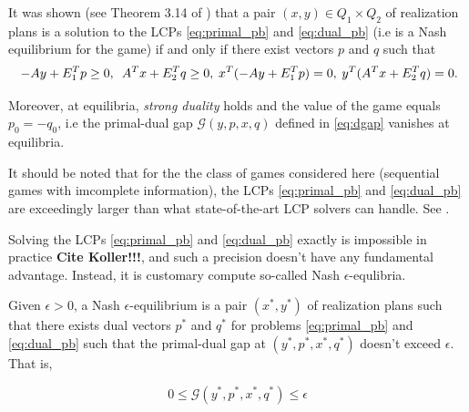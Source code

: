 \documentclass[envcountsame]{llncs} %
\begin{document}
It was shown (see Theorem 3.14 of \cite{vonequilibrium}) that a pair
$(x, y) \in Q_1 \times Q_2$ of realization plans is a solution to the
LCPs \eqref{eq:primal_pb} and \eqref{eq:dual_pb} (i.e is a Nash
equilibrium for the game)  if and only if there exist vectors $p$ and
$q$ such that
\begin{equation}
\hspace{.25em} -Ay + E_1^Tp \ge 0, \hspace{.5em}A^Tx + E_2^Tq \ge
0, \hspace{.25em} x^T(-Ay + E_1^Tp) = 0, \hspace{.25em} y^T(A^Tx +
E_2^Tq) = 0.
\label{eq:feasibility}
\end{equation}

Moreover, at equilibria, \textit{strong duality} holds and the value of the game equals $p_0 = -q_0$, i.e the primal-dual gap $\mathcal{G}(y, p, x, q)$ defined in \eqref{eq:dgap} vanishes at equilibria.


\begin{remark}  
It should be noted that for the the class of games considered here (sequential games with imcomplete information), the LCPs \eqref{eq:primal_pb} and \eqref{eq:dual_pb} are exceedingly larger than what state-of-the-art LCP solvers can handle. See \cite{hoda2010smoothing}.
\end{remark}

Solving the LCPs \eqref{eq:primal_pb} and \eqref{eq:dual_pb} exactly is impossible in practice \textbf{Cite Koller!!!}, and such a precision doesn't have any fundamental advantage. Instead, it is customary compute so-called Nash $\epsilon$-equlibria.

\begin{definition}
Given $\epsilon > 0$, a Nash $\epsilon$-equilibrium is
a pair $(x^*, y^*)$ of realization plans such that there exists dual
vectors $p^*$ and $q^*$ for problems \eqref{eq:primal_pb} and
\eqref{eq:dual_pb} such that the primal-dual gap at $(y^*, p^*, x^*, q^*)$
doesn't exceed $\epsilon$. That is,

\begin{equation}
  0 \le \mathcal{G}(y^*, p^*, x^*, q^*) \le \epsilon
\label{eq:approx_pb}
\end{equation}
\end{definition}
\end{document}
